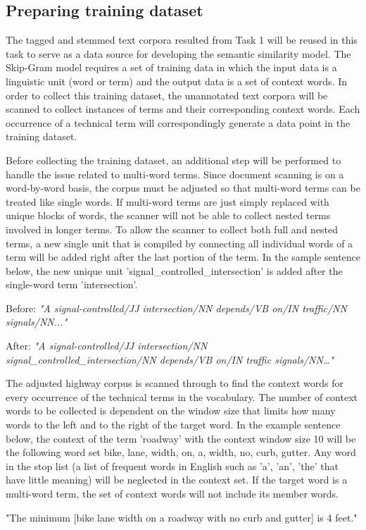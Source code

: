 \documentclass[Journal, InsideFigs, DoubleSpace]{ascelike} %
\begin{document}
\subsection{Preparing training dataset}
The tagged and stemmed text corpora resulted from Task 1 will be reused in this task to serve as a data source for developing the semantic similarity model. The Skip-Gram model requires a set of training data in which the input data is a linguistic unit (word or term) and the output data is a set of context words. In order to collect this training dataset, the unannotated text corpora will be scanned to collect instances of terms and their corresponding context words. Each occurrence of a technical term will correspondingly generate a data point in the training dataset.
\par
Before collecting the training dataset, an additional step will be performed to handle the issue related to multi-word terms. Since document scanning is on a word-by-word basis, the corpus must be adjusted so that multi-word terms can be treated like single words. If multi-word terms are just simply replaced with unique blocks of words, the scanner will not be able to collect nested terms involved in longer terms. To allow the scanner to collect both full and nested terms, a new single unit that is compiled by connecting all individual words of a term will be added right after the last portion of the term.  In the sample sentence below, the new unique unit 'signal\_controlled\_intersection' is added after the single-word term 'intersection'.
%
\begin{center}
Before: \textit{"A signal-controlled/JJ intersection/NN depends/VB on/IN traffic/NN signals/NN..." }

After: \textit{"A signal-controlled/JJ intersection/NN signal\_controlled\_intersection/NN depends/VB on/IN traffic signals/NN…"}

\end{center}
%
The adjusted highway corpus is scanned through to find the context words for every occurrence of the technical terms in the vocabulary. The number of context words to be collected is dependent on the window size that limits how many words to the left and to the right of the target word. In the example sentence below, the context of the term 'roadway' with the context window size 10 will be the following word set {bike, lane, width, on, a, width, no, curb, gutter}. Any word in the stop list (a list of frequent words in English such as 'a', 'an', 'the' that have little meaning) will be neglected in the context set. If the target word is a multi-word term, the set of context words will not include its member words. 
\begin{center}
	"The minimum [bike lane width on a roadway with no curb and gutter] is 4 feet."
\end{center}
\end{document}
